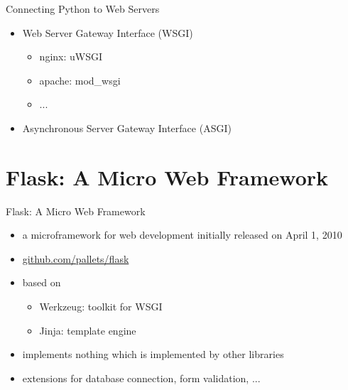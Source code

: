 \documentclass{beamer}
\begin{document}
\begin{frame}{Connecting Python to Web Servers}
 
  \begin{itemize}
    \item Web Server Gateway Interface (WSGI)
    \begin{itemize}
      \item nginx: uWSGI
      \item apache: mod\_wsgi
      \item ...
    \end{itemize}
    \item Asynchronous Server Gateway Interface (ASGI)
  \end{itemize}
  
\end{frame}



\section{Flask: A Micro Web Framework}


\begin{frame}{Flask: A Micro Web Framework}
 
  \begin{itemize}
    \item a microframework for web development initially released 
      on April 1, 2010
    \item \href{https://github.com/pallets/flask}{github.com/pallets/flask}
    \item based on 
    \begin{itemize}
      \item Werkzeug: toolkit for WSGI
      \item Jinja: template engine
    \end{itemize}
    \item implements nothing which is implemented by other libraries
    \item extensions for database connection, form validation, ...
  \end{itemize}
  
\end{frame}

\end{document}
